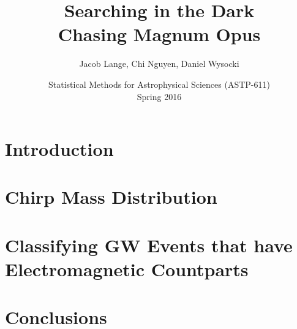 \documentclass[12pt]{article}
\title{
Searching in the Dark
\\
Chasing Magnum Opus
}
\author{
  Jacob Lange, Chi Nguyen, Daniel Wysocki
}
\date{
  Statistical Methods for Astrophysical Sciences (ASTP-611)
  \\
  Spring 2016
}
\begin{document}
\maketitle


\section{Introduction}
\label{sec:intro}

\section{Chirp Mass Distribution}
\label{sec:dist}





\section{Classifying GW Events that have Electromagnetic Countparts}
\label{sec:classifier}


\section{Conclusions}
\label{sec:conclusions}




\printbibliography[heading=subbibliography]
\end{document}
